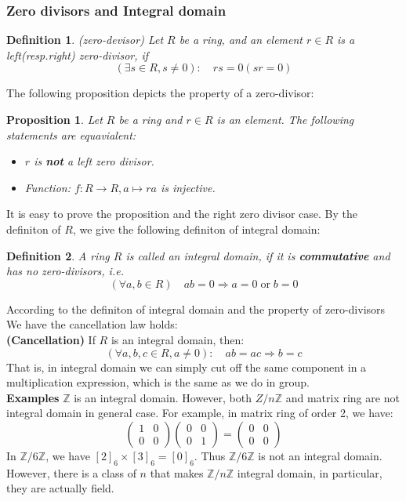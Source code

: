 \documentclass[a4paper, pdf, 11.5pt]{article}
\newtheorem{definition}{Definition}
\newtheorem{prop}{Proposition}
\begin{document}
\subsubsection{Zero divisors and Integral domain}
\begin{definition}(zero-devisor)
  Let $R$ be a ring, and an element $r\in R$ is a left(resp.right) zero-divisor, if 
  $$(\exists s\in R, s\neq0):\quad rs = 0(sr=0)$$
\end{definition}
The following proposition depicts the property of a zero-divisor:
\begin{prop}
Let $R$ be a ring and $r\in R$ is an element. The following statements are equavialent:
\begin{itemize}
  \item  $r$ is \textbf{not} a left zero divisor.
  \item Function: $f:R\longrightarrow R, a\mapsto ra$ is injective.
\end{itemize}
\end{prop}
\vspace{0.5cm}
It is easy to prove the proposition and the right zero divisor case. By the definiton of $R$, we give the following definiton of integral domain:

\begin{definition}
 A ring $R$ is called an integral domain, if it is \textbf{commutative} and has no zero-divisors, i.e. 
$$
(\forall a,b\in R)\quad ab=0\Longrightarrow a=0\;\mbox{or}\;b=0
$$
\end{definition}
\vspace{0.5cm}
According to the definiton of integral domain and the property of zero-divisors We have the cancellation law holds:
\\
\noindent
\textbf{(Cancellation)} If $R$ is an integral domain, then:
$$
(\forall a,b,c\in R, a\neq 0):\quad
ab=ac\Longrightarrow b =c
$$
That is, in integral domain we can simply cut off the same component in a multiplication expression, which is the same as we do in group.\\
\noindent
\textbf{Examples}
$\mathbb{Z}$ is an integral domain. However, both $Z/n\mathbb{Z}$ and matrix ring are not integral domain in general case. 
For example, in matrix ring of order 2, we have:
$$
\begin{pmatrix}
1 & 0\\
0 & 0
\end{pmatrix}
\begin{pmatrix}
0 & 0\\
0 & 1
\end{pmatrix}
= \begin{pmatrix}
0 & 0\\
0 & 0
\end{pmatrix}
$$
In $\mathbb{Z}/6\mathbb{Z}$, we have $[2]_{6}\times[3]_{6}=[0]_{6}$. Thus $\mathbb{Z}/6\mathbb{Z}$ is not an integral domain.
However, there is a class of $n$ that makes $\mathbb{Z}/n\mathbb{Z}$ integral domain, in particular, they are actually field. 
\end{document}
